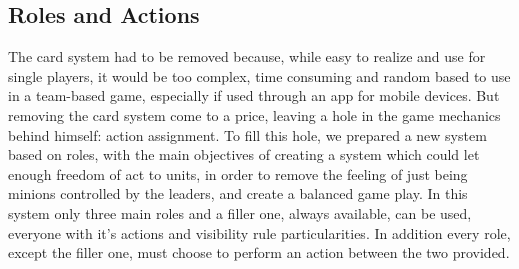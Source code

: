 		\subsection{Roles and Actions}
		
			The card system had to be removed because, while easy to realize and use for single players, it would be too complex, time consuming and random based to use in a team-based game, especially if used through an app for mobile devices.
			But removing the card system come to a price, leaving a hole in the game mechanics behind himself: action assignment.
			To fill this hole, we prepared a new system based on roles, with the main objectives of creating a system which could let enough freedom of act to units, in order to remove the feeling of just being minions controlled by the leaders, and create a balanced game play.
			In this system only three main roles and a filler one, always available, can be used, everyone with it's actions and visibility rule particularities.
			In addition every role, except the filler one, must choose to perform an action between the two provided.
		
